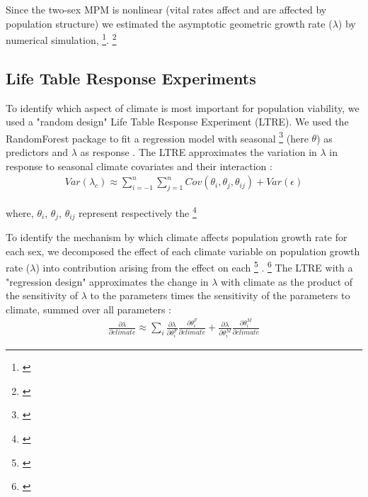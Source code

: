 \documentclass[12pt]{article}
\newcommand{\tom}[2]{{\color{red}{#1}}\footnote{\textit{\color{red}{#2}}}}
\begin{document}
Since the two-sex MPM is nonlinear (vital rates affect and are affected by population structure) we estimated the asymptotic geometric growth rate ($\lambda$) by numerical simulation, \tom{and repeated this across a range of climate}{Vague - needs more detail.}.
\tom{}{Too much of this section is familiar to me from the Am Nat paper. I suggest you write this in your own voice. You also should provide an explanation for the female-dominant model.}

\subsection*{Life Table Response Experiments}
To identify which aspect of climate is most important for population viability, we used a "random design" Life Table Response Experiment (LTRE). 
We used the RandomForest package to fit a regression model with seasonal \tom{climate}{It is unclear what variation in climate you are sampling over.} (here $\theta$) as predictors  and $\lambda$ as response \citep{ellner2016data,liaw2002classification}.
The LTRE approximates the variation in $\lambda$ in response to seasonal climate covariates and their interaction \citep{caswell2000matrix,hernandez2023exact}:
\begin{align}\label{eq:ltre}
Var(\lambda_{c})\approx \sum_{i=-1}^{n}\sum_{j=1}^{n} Cov(\theta_{i},\theta_{j},\theta_{ij}) + Var (\epsilon)
\end{align}

\noindent where, $\theta_{i}$, $\theta_{j}$, $\theta_{ij}$  represent respectively the \tom{fitted regression slope for the covariates of the dormant season,j the covariates of the growing season and ij the covariates of their interactions.}{But you also have second-order terms, and I am not sure whether and how this LTRE accounts for that. Also, what is $n$ here? Why does the summation over i start at -1? And why do you show only two variables, since you have four?} 

To identify the mechanism by which climate affects population growth rate for each sex, we decomposed the effect of each climate variable on population growth rate ($\lambda$) into contribution arising from the effect on each \tom{stage-specific vital rate}{I don't know what you mean by ``stage-specific''} \citep{caswell2000matrix}.
\tom{At this end we used another LTRE with a "regression design".}{I think you need greater clarification about what different information you get out of the two LTREs, and how they relate to the motivating biological questions. I understand this, of course, but I think readers will be confused.} 
The LTRE with a "regression design" approximates the change in $\lambda$ with climate as the product of the sensitivity of $\lambda$ to the parameters times the sensitivity of the parameters to climate, summed over all parameters \citep{caswell1989analysis}:
\begin{align}\label{eq:ltresex}
\frac{\partial \lambda}{\partial climate} \approx \sum_{i} \frac{\partial \lambda}{\partial \theta^{F}_{i}} \frac{\partial \theta^{F}_{i}}{\partial climate} + \frac{\partial \lambda}{\partial \theta^{M}_{i}} \frac{\partial \theta^{M}_{i}}{\partial climate}
\end{align}
\end{document}
